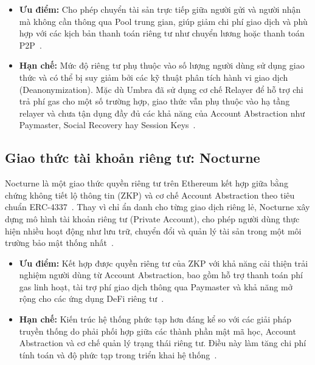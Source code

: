 \documentclass[../DoAn.tex]{subfiles}
\begin{document}
\begin{itemize}
\item \textbf{Ưu điểm:} Cho phép chuyển tài sản trực tiếp giữa người gửi và người nhận mà không cần thông qua Pool trung gian, giúp giảm chi phí giao dịch và phù hợp với các kịch bản thanh toán riêng tư như chuyển lương hoặc thanh toán P2P~\cite{umbra_docs}.


\item \textbf{Hạn chế:} Mức độ riêng tư phụ thuộc vào số lượng người dùng sử dụng giao thức và có thể bị suy giảm bởi các kỹ thuật phân tích hành vi giao dịch (Deanonymization). Mặc dù Umbra đã sử dụng cơ chế Relayer để hỗ trợ chi trả phí gas cho một số trường hợp, giao thức vẫn phụ thuộc vào hạ tầng relayer và chưa tận dụng đầy đủ các khả năng của Account Abstraction như Paymaster, Social Recovery hay Session Keys~\cite{umbra_docs}.

\end{itemize}

\subsection{Giao thức tài khoản riêng tư: Nocturne}

Nocturne là một giao thức quyền riêng tư trên Ethereum kết hợp giữa bằng chứng không tiết lộ thông tin (ZKP) và cơ chế Account Abstraction theo tiêu chuẩn ERC-4337~\cite{erc4337}. Thay vì chỉ ẩn danh cho từng giao dịch riêng lẻ, Nocturne xây dựng mô hình tài khoản riêng tư (Private Account), cho phép người dùng thực hiện nhiều hoạt động như lưu trữ, chuyển đổi và quản lý tài sản trong một môi trường bảo mật thống nhất~\cite{nocturne_docs}.

\begin{itemize}
\item \textbf{Ưu điểm:} Kết hợp được quyền riêng tư của ZKP với khả năng cải thiện trải nghiệm người dùng từ Account Abstraction, bao gồm hỗ trợ thanh toán phí gas linh hoạt, tài trợ phí giao dịch thông qua Paymaster và khả năng mở rộng cho các ứng dụng DeFi riêng tư~\cite{nocturne_docs}.


\item \textbf{Hạn chế:} Kiến trúc hệ thống phức tạp hơn đáng kể so với các giải pháp truyền thống do phải phối hợp giữa các thành phần mật mã học, Account Abstraction và cơ chế quản lý trạng thái riêng tư. Điều này làm tăng chi phí tính toán và độ phức tạp trong triển khai hệ thống~\cite{nocturne_docs}.


\end{itemize}
\end{document}
